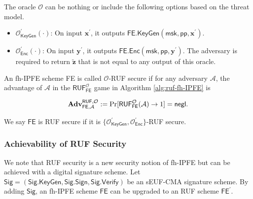 The oracle $\mathcal{O}$ can be nothing or include the following options based on the threat model.

\begin{itemize}

	\item $\mathcal{O}^\prime_{\textsf{KeyGen}}(\cdot)$: On input $\mathbf{x}^\prime$, it outputs $\textsf{FE.KeyGen}(\textsf{msk}, \textsf{pp}, \mathbf{x}^\prime)$.
	
	\item $\mathcal{O}^\prime_{\textsf{Enc}}(\cdot)$: On input $\mathbf{y}^\prime$, it outputs $\textsf{FE.Enc}(\textsf{msk}, \textsf{pp}, \mathbf{y}^\prime)$. The adversary is required to return $\mathbf{\tilde{z}}$ that is not equal to any output of this oracle.
\end{itemize}

\begin{definition}

	An fh-IPFE scheme \textsf{FE} is called $\mathcal{O}$-RUF secure if for any adversary $\mathcal{A}$, the advantage of $\mathcal{A}$ in the $\textsf{RUF}^{\mathcal{O}}_\textsf{FE}$ game in Algorithm \ref{alg:ruf-fh-IPFE} is

\[
	\mathbf{Adv}_{\textsf{FE}, \mathcal{A}}^{\textsf{RUF}, \mathcal{O}} := \Pr[\textsf{RUF}^{\mathcal{O}}_{\textsf{FE}}(\mathcal{A}) \to 1 ] = \mathsf{negl}.
\]

\noindent We say $\textsf{FE}$ is RUF secure if it is $\{ \mathcal{O}^\prime_{\textsf{KeyGen}}, \mathcal{O}^\prime_{\textsf{Enc}} \}$-RUF secure.

\end{definition}

\subsubsection{Achievability of RUF Security}

We note that RUF security is a new security notion of fh-IPFE but can be achieved with a digital signature scheme. Let $\textsf{Sig} = ( \textsf{Sig.KeyGen}, \textsf{Sig.Sign}, \textsf{Sig.Verify} )$ be an sEUF-CMA signature scheme. By adding $\textsf{Sig}$, an fh-IPFE scheme $\textsf{FE}$ can be upgraded to an RUF scheme $\textsf{FE}^\prime$. 

